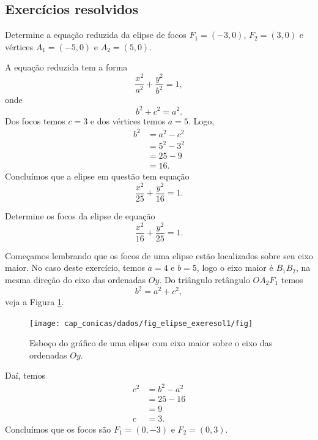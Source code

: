 \subsection*{Exercícios resolvidos}

\begin{exeresol}
  Determine a equação reduzida da elipse de focos $F_1=(-3,0)$, $F_2=(3,0)$ e vértices $A_1=(-5,0)$ e $A_2=(5,0)$.
\end{exeresol}
\begin{resol}
  A equação reduzida tem a forma
  \begin{equation}
    \frac{x^2}{a^2} + \frac{y^2}{b^2} = 1,
  \end{equation}
  onde
  \begin{equation}
    b^2 + c^2 = a^2.
  \end{equation}
  Dos focos temos $c=3$ e dos vértices temos $a=5$. Logo,
  \begin{align}
    b^2 &=  a^2 - c^2 \\
        &= 5^2 - 3^2 \\
        &= 25 - 9 \\
        &= 16.
  \end{align}
  Concluímos que a elipse em questão tem equação
  \begin{equation}
    \frac{x^2}{25} + \frac{y^2}{16} = 1.
  \end{equation}
\end{resol}

\begin{exeresol}
  Determine os focos da elipse de equação
  \begin{equation}
    \frac{x^2}{16} + \frac{y^2}{25} = 1.
  \end{equation}
\end{exeresol}
\begin{resol}
  Começamos lembrando que os focos de uma elipse estão localizados sobre seu eixo maior. No caso deste exercício, temos $a=4$ e $b=5$, logo o eixo maior é $B_1B_2$, na mesma direção do eixo das ordenadas $Oy$. Do triângulo retângulo $OA_2F_1$ temos
  \begin{equation}
    b^2 = a^2 + c^2,
  \end{equation}
  veja a Figura \ref{fig:elipse_exeresol1}.

  \begin{figure}[H]
    \centering
    \texttt{[image: cap\_conicas/dados/fig\_elipse\_exeresol1/fig]}
    \caption{Esboço do gráfico de uma elipse com eixo maior sobre o eixo das ordenadas $Oy$.}
    \label{fig:elipse_exeresol1}
  \end{figure}

  Daí, temos
  \begin{align}
    c^2 &= b^2 - a^2 \\
        &= 25 - 16 \\
        &= 9 \\
    c &= 3.
  \end{align}
  Concluímos que os focos são $F_1=(0,-3)$ e $F_2=(0,3)$.
\end{resol}

